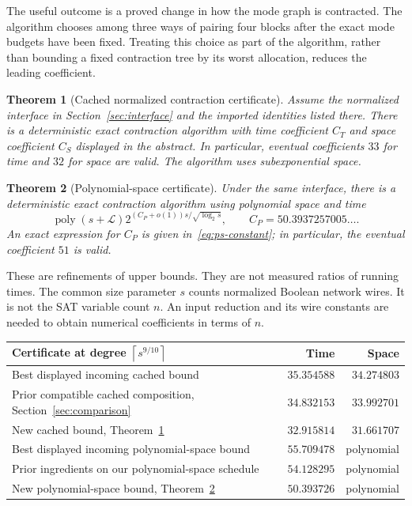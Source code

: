 \documentclass[11pt,letterpaper]{article}
\newtheorem{theorem}{Theorem}[section]
\theoremstyle{remark}\newtheorem{remark}[theorem]{Remark}
\newcommand{\poly}{\operatorname{poly}}
\newcommand{\ceil}[1]{\left\lceil#1\right\rceil}
\begin{document}
The useful outcome is a proved change in how the mode graph is contracted.
The algorithm chooses among three ways of pairing four blocks after the
exact mode budgets have been fixed. Treating this choice as part of the
algorithm, rather than bounding a fixed contraction tree by its worst
allocation, reduces the leading coefficient.

\begin{theorem}[Cached normalized contraction certificate]
\label{thm:cached}
Assume the normalized interface in Section~\ref{sec:interface} and the
imported identities listed there. There is a deterministic exact contraction
algorithm with time coefficient $C_T$ and space coefficient $C_S$ displayed
in the abstract. In particular, eventual coefficients $33$ for time and
$32$ for space are valid. The algorithm uses subexponential space.
\end{theorem}

\begin{theorem}[Polynomial-space certificate]
\label{thm:ps}
Under the same interface, there is a deterministic exact contraction
algorithm using polynomial space and time
\[
 \poly(s+\mathcal L)2^{(C_P+o(1))s/\sqrt{\log_2s}},
 \qquad C_P=50.3937257005\ldots .
\]
An exact expression for $C_P$ is given in~\eqref{eq:ps-constant}; in
particular, the eventual coefficient $51$ is valid.
\end{theorem}

These are refinements of upper bounds. They are not measured ratios of
running times. The common size parameter $s$ counts normalized Boolean
network wires. It is not the SAT variable count $n$. An input reduction and
its wire constants are needed to obtain numerical coefficients in terms of
$n$.

\begin{center}
\begin{tabular}{@{}p{}rr@{}}
\toprule
Certificate at degree $\ceil{s^{9/10}}$ & Time & Space\\\midrule
Best displayed incoming cached bound \cite{tree} & $35.354588$ & $34.274803$\\
Prior compatible cached composition, Section~\ref{sec:comparison}
 & $34.832153$ & $33.992701$\\
New cached bound, Theorem~\ref{thm:cached} & $32.915814$ & $31.661707$\\\midrule
Best displayed incoming polynomial-space bound \cite{adaptive}
 & $55.709478$ & polynomial\\
Prior ingredients on our polynomial-space schedule & $54.128295$ & polynomial\\
New polynomial-space bound, Theorem~\ref{thm:ps} & $50.393726$ & polynomial\\
\bottomrule
\end{tabular}
\end{center}
\end{document}
